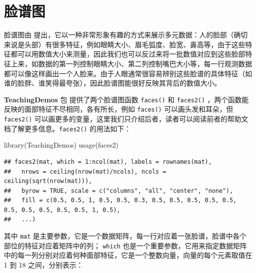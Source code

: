 \documentclass[
  b5paper,
  UTF8,twoside]{book}
\newenvironment{Shaded}{\begin{snugshade}}{\end{snugshade}}
\newcommand{\FunctionTok}[1]{\textcolor[rgb]{0.00,0.00,0.00}{#1}}
\newcommand{\NormalTok}[1]{#1}
\begin{document}
\hypertarget{sec:faces}{%
\section{脸谱图}\label{sec:faces}}

脸谱图由 \citet{Chernoff73} 提出，它以一种非常形象有趣的方式来展示多元数据：人的脸部（确切来说是头部）有很多特征，例如眼睛大小、眉毛弧度、脸宽、鼻高等，由于这些特征都可以用数值大小来测量，因此我们也可以反过来将一批数值对应到这些脸部特征上来，如数据的第一列控制眼睛大小、第二列控制嘴巴大小等，每一行观测数据都可以像这样画出一个人脸来。由于人眼通常很容易辨别这些脸谱的具体特征（如谁的脸胖、谁笑得最夸张），因此脸谱图能很好反映其背后的数值大小。

\textbf{TeachingDemos} 包 \citep{TeachingDemos} 提供了两个脸谱图函数 \texttt{faces()} 和 \texttt{faces2()} ，两个函数能反映的面部特征不尽相同，各有所长，例如 \texttt{faces()} 可以画头发和耳朵，但 \texttt{faces2()} 可以画更多的变量，这里我们只介绍后者，读者可以阅读前者的帮助文档了解更多信息。\texttt{faces2()} 的用法如下：

\begin{Shaded}
\begin{Highlighting}[]
\FunctionTok{library}\NormalTok{(TeachingDemos)}
\FunctionTok{usage}\NormalTok{(faces2)}
\end{Highlighting}
\end{Shaded}

\begin{verbatim}
## faces2(mat, which = 1:ncol(mat), labels = rownames(mat),
##   nrows = ceiling(nrow(mat)/ncols), ncols = ceiling(sqrt(nrow(mat))),
##   byrow = TRUE, scale = c("columns", "all", "center", "none"),
##   fill = c(0.5, 0.5, 1, 0.5, 0.5, 0.3, 0.5, 0.5, 0.5, 0.5, 0.5, 0.5, 0.5, 0.5, 0.5, 0.5, 1, 0.5),
##   ...)
\end{verbatim}

其中 \texttt{mat} 是主要参数，它是一个数据矩阵，每一行对应着一张脸谱，脸谱中各个部位的特征对应着矩阵中的列； \texttt{which} 也是一个重要参数，它用来指定数据矩阵中的每一列分别对应着何种面部特征，它是一个整数向量，向量的每个元素取值在 1 到 18 之间，分别表示：
\end{document}
